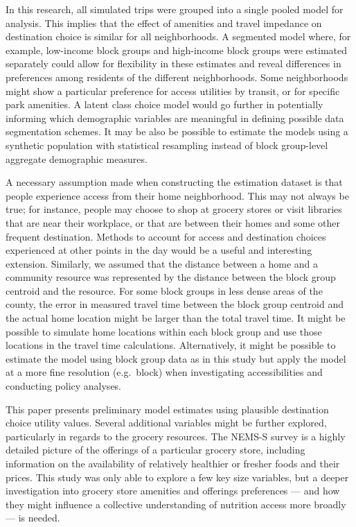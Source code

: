 \documentclass[ijerph,article,submit,moreauthors,pdftex]{mdpi}
\begin{document}
In this research, all simulated trips were grouped into a single pooled model
for analysis. This implies that the effect of amenities and travel impedance on
destination choice is similar for all neighborhoods. A segmented model
where, for example, low-income block groups and high-income block groups were
estimated separately could allow for flexibility in these estimates and reveal
differences in preferences among residents of the different neighborhoods. Some
neighborhoods might show a particular preference for access utilities by
transit, or for specific park amenities. A latent class choice model \citep{walker2002}
would go further in potentially informing which demographic variables are
meaningful in defining possible data segmentation schemes. It may be also be
possible to estimate the models using a synthetic population with statistical
resampling instead of block group-level aggregate demographic measures.

A necessary assumption made when constructing the estimation dataset is that
people experience access from their home neighborhood. This may not always be true;
for instance, people may choose to shop at grocery stores or visit libraries that
are near their workplace, or that are between their homes and some other
frequent destination. Methods to account for access and destination choices
experienced at other points in the day would be a useful and interesting extension.
Similarly, we assumed that the distance between a home and a community resource
was represented by the distance between the block group centroid and the resource.
For some block groups in less dense areas of the county, the error in measured
travel time between the block group centroid and the actual home location might be
larger than the total travel time. It might be possible to simulate home locations
within each block group and use those locations in the travel time calculations.
Alternatively, it might be possible to estimate the model using block group data
as in this study but apply the model at a more fine resolution (e.g.~block) when
investigating accessibilities and conducting policy analyses.

This paper presents preliminary model estimates using plausible destination
choice utility values. Several additional variables might be further explored,
particularly in regards to the grocery resources. The NEMS-S survey is a highly
detailed picture of the offerings of a particular grocery store, including
information on the availability of relatively healthier or fresher foods and
their prices. This study was only able to explore a few key size variables, but
a deeper investigation into grocery store amenities and offerings
preferences --- and how they might influence a collective understanding of
nutrition access more broadly --- is needed.
\end{document}
